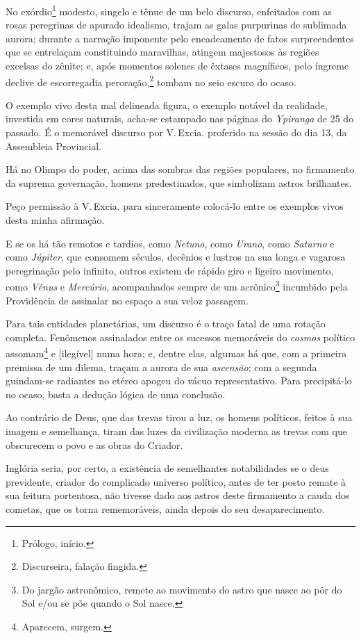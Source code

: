 No exórdio\footnote{Prólogo, início.} modesto, singelo e tênue de um
belo discurso, enfeitados com as rosas peregrinas de apurado idealismo,
trajam as galas purpurinas de sublimada aurora; durante a narração
imponente pelo encadeamento de fatos surpreendentes que se entrelaçam
constituindo maravilhas, atingem majestosos às regiões excelsas do
zênite; e, após momentos solenes de êxtases magníficos, pelo íngreme
declive de escorregadia peroração,\footnote{Discurseira, falação
  fingida.} tombam no seio escuro do ocaso.

O exemplo vivo desta mal delineada figura, o exemplo notável da
realidade, investida em cores naturais, acha-se estampado nas páginas do
\emph{Ypiranga} de 25 do passado. É o memorável discurso por V.\,Excia.
proferido na sessão do dia 13, da Assembleia Provincial.

Há no Olimpo do poder, acima das sombras das regiões populares, no
firmamento da suprema governação, homens predestinados, que simbolizam
astros brilhantes.

Peço permissão à V.\,Excia. para sinceramente colocá-lo entre os exemplos
vivos desta minha afirmação.

E se os há tão remotos e tardios, como \emph{Netuno}, como \emph{Urano},
como \emph{Saturno} e como \emph{Júpiter}, que consomem séculos,
decênios e lustros na sua longa e vagarosa peregrinação pelo infinito,
outros existem de rápido giro e ligeiro movimento, como \emph{Vênus} e
\emph{Mercúrio}, acompanhados sempre de um acrônico\footnote{Do jargão
  astronômico, remete ao movimento do astro que nasce ao pôr do Sol e/ou
  se põe quando o Sol nasce.} incumbido pela Providência de assinalar no
espaço a sua veloz passagem.

Para tais entidades planetárias, um discurso é o traço fatal de uma
rotação completa. Fenômenos assinalados entre os sucessos memoráveis do
\emph{cosmos} político assomam\footnote{Aparecem, surgem.} e
{[}ilegível{]} numa hora; e, dentre elas, algumas há que, com a primeira
premissa de um dilema, traçam a aurora de sua \emph{ascensão}; com a
segunda guindam-se radiantes no etéreo apogeu do vácuo representativo.
Para precipitá-lo no ocaso, basta a dedução lógica de uma conclusão.

Ao contrário de Deus, que das trevas tirou a luz, os homens políticos,
feitos à sua imagem e semelhança, tiram das luzes da civilização moderna
as trevas com que obscurecem o povo e as obras do Criador.

Inglória seria, por certo, a existência de semelhantes notabilidades se
o deus previdente, criador do complicado universo político, antes de ter
posto remate à sua feitura portentosa, não tivesse dado aos astros deste
firmamento a cauda dos cometas, que os torna rememoráveis, ainda depois
do seu desaparecimento.

